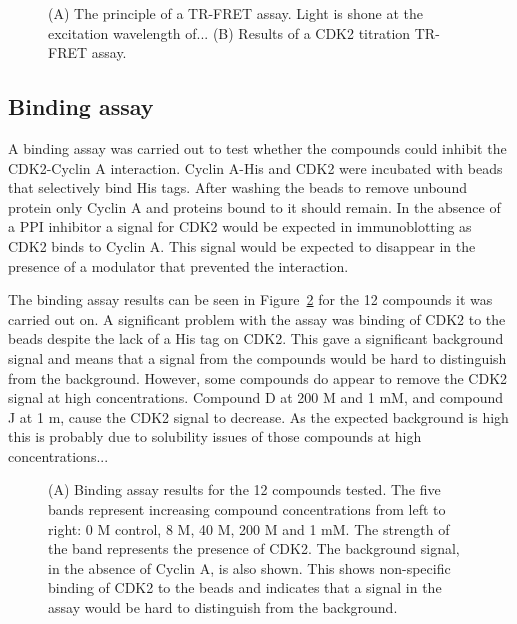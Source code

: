 \begin{figure}
\centering


\caption{(A) The principle of a TR-FRET assay.
Light is shone at the excitation wavelength of...
(B) Results of a CDK2 titration TR-FRET assay.}

\label{fig:tr_fret}
\end{figure}


\subsection{Binding assay}

A binding assay was carried out to test whether the compounds could inhibit the CDK2-Cyclin A interaction.
Cyclin A-His and CDK2 were incubated with beads that selectively bind His tags.
After washing the beads to remove unbound protein only Cyclin A and proteins bound to it should remain.
In the absence of a PPI inhibitor a signal for CDK2 would be expected in immunoblotting as CDK2 binds to Cyclin A.
This signal would be expected to disappear in the presence of a modulator that prevented the interaction.

The binding assay results can be seen in Figure~\ref{fig:binding_assay} for the 12 compounds it was carried out on.
A significant problem with the assay was binding of CDK2 to the beads despite the lack of a His tag on CDK2.
This gave a significant background signal and means that a signal from the compounds would be hard to distinguish from the background.
However, some compounds do appear to remove the CDK2 signal at high concentrations.
Compound D at 200 \textmu M and 1 mM, and compound J at 1 m, cause the CDK2 signal to decrease.
As the expected background is high this is probably due to solubility issues of those compounds at high concentrations...

\begin{figure}
\centering


\caption{(A) Binding assay results for the 12 compounds tested.
The five bands represent increasing compound concentrations from left to right: 0 M control, 8 \textmu M, 40 \textmu M, 200 \textmu M and 1 mM.
The strength of the band represents the presence of CDK2.
The background signal, in the absence of Cyclin A, is also shown.
This shows non-specific binding of CDK2 to the beads and indicates that a signal in the assay would be hard to distinguish from the background.}

\label{fig:binding_assay}
\end{figure}


